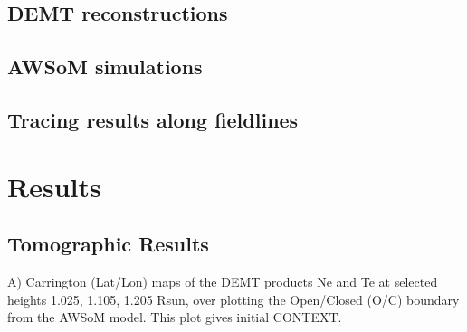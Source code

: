 \documentclass[namedreferences]{solarphysics}
\begin{document}
\begin{article}
\subsection{DEMT reconstructions}\label{demt} 

\subsection{AWSoM simulations}\label{awsom} 

\subsection{Tracing results along fieldlines}\label{trace} 



\section{Results}\label{resu} 
\subsection{Tomographic Results}\label{demt_res} 
A) Carrington (Lat/Lon) maps of the DEMT products Ne and Te at selected heights 1.025, 1.105, 1.205 Rsun, over plotting the Open/Closed (O/C) boundary from the AWSoM model. This plot gives initial CONTEXT.


\end{article}
\end{document}
